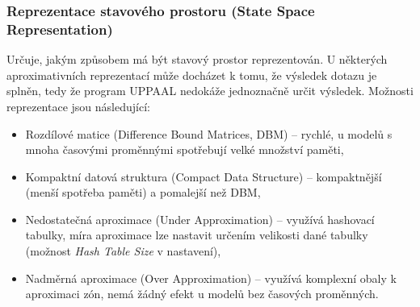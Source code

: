 \subsubsection{Reprezentace stavového prostoru (State Space Representation)}
Určuje, jakým způsobem má být stavový prostor reprezentován. U některých aproximativních reprezentací může docházet k tomu, že výsledek dotazu je  splněn, tedy že program UPPAAL nedokáže jednoznačně určit výsledek. Možnosti reprezentace jsou následující:
\begin{itemize}
    \item Rozdílové matice (Difference Bound Matrices, DBM) -- rychlé, u modelů s mnoha časovými proměnnými spotřebují velké množství paměti,
    \item Kompaktní datová struktura (Compact Data Structure) -- kompaktnější (menší spotřeba paměti) a pomalejší než DBM,
    \item Nedostatečná aproximace (Under Approximation) -- využívá hashovací tabulky, míra aproximace lze nastavit určením velikosti dané tabulky (možnost \textit{Hash Table Size} v nastavení),
    \item Nadměrná aproximace (Over Approximation) -- využívá komplexní obaly k aproximaci zón, nemá žádný efekt u modelů bez časových proměnných.
\end{itemize}

